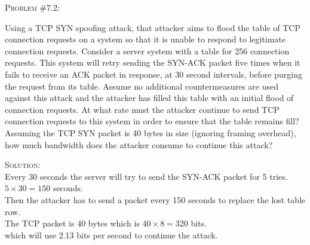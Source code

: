 \documentclass[12pt]{article}
\newenvironment{problem}[1]
{\begin{mdframed}[linewidth=0.8pt]
        \textsc{Problem #1:}

}
    {\end{mdframed}}
\newenvironment{solution}
    {\textsc{Solution:}\\}
    {\newpage}%
\begin{document}
	\begin{problem}{\#7.2}
		Using a TCP SYN spoofing attack, that attacker aims to flood the table of TCP connection requests on a system so that it is unable to respond to legitimate connection requests. Consider a server system with a table for 256 connection requests. This system will retry sending the SYN-ACK packet five times when it fails to receive an ACK packet in response, at 30 second intervals, before purging the request from its table. Assume no additional countermeasures are used against this attack and the attacker has filled this table with an initial flood of connection requests. At what rate must the attacker continue to send TCP connection requests to this system in order to ensure that the table remains fill? Assuming the TCP SYN packet is 40 bytes in size (ignoring framing overhead), how much bandwidth does the attacker consume to continue this attack?
	\end{problem}
	\begin{solution}
		Every 30 seconds the server will try to send the SYN-ACK packet for 5 tries. $5 \times 30 = 150$ seconds.\\
		Then the attacker has to send a packet every 150 seconds to replace the lost table row.\\
		The TCP packet is 40 bytes which is $40\times 8 = 320$ bits.\\
		which will use 2.13 bits per second to continue the attack.
	\end{solution}
\end{document}
